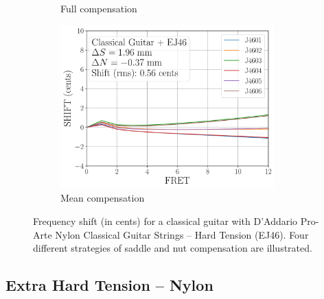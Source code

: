 \begin{figure}
\begin{subfigure}[b]{0.45\textwidth}
   \caption{Full compensation}
   \label{fig:shift_classicalguitar_ej46_full}
  \end{subfigure}
  \hspace{0.25in}
  \begin{subfigure}[b]{0.45\textwidth}
   \centering
   \includegraphics[width=3.25in]{../figures/shift_classicalguitar_ej46_mean}
   \caption{Mean compensation}
   \label{fig:shift_classicalguitar_ej46_mean}
  \end{subfigure}
  \caption{\label{fig:compensation_classicalguitar_ej46} Frequency shift (in cents) for a classical guitar with D'Addario Pro-Arte Nylon Classical Guitar Strings -- Hard Tension (EJ46). Four different strategies of saddle and nut compensation are illustrated.}
 \end{figure}

 \newpage
 \subsection{Extra Hard Tension -- Nylon}


